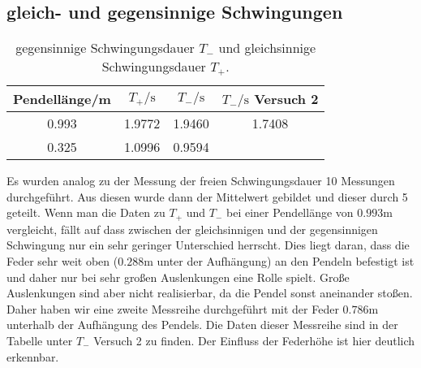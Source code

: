   \subsection{gleich- und gegensinnige Schwingungen}
    \begin{table}
      \centering
        \caption{gegensinnige Schwingungsdauer $T_{-}$ und gleichsinnige Schwingungsdauer $T_{+}$.}
        \label{tab:aufgabe23}
        \begin{tabular}{S S S S}
          \toprule
          {Pendellänge/m} & {$T_{+}/\si{\second}$} & {$T_{-}/\si{\second}$} & {$T_{-}/\si{\second}$ Versuch 2}\\
                     & 1.9772    & 1.9460   & 1.7408 \\
          0.325           & 1.0996   & 0.9594    &         \\
          \bottomrule
        \end{tabular}
    \end{table}
    Es wurden analog zu der Messung der freien Schwingungsdauer 10 Messungen durchgeführt. Aus diesen wurde dann der Mittelwert
    gebildet und dieser durch 5 geteilt. Wenn man die Daten zu $T_{+}$ und $T_{-}$ bei einer Pendellänge von $0.993$m vergleicht,
    fällt auf dass zwischen der gleichsinnigen und der gegensinnigen Schwingung nur ein sehr geringer Unterschied herrscht. Dies
    liegt daran, dass die Feder sehr weit oben ($0.288$m unter der Aufhängung) an den Pendeln befestigt ist und daher nur bei
    sehr großen Auslenkungen eine Rolle spielt. Große Auslenkungen sind aber nicht realisierbar, da die Pendel sonst aneinander
    stoßen. Daher haben wir eine zweite Messreihe durchgeführt mit der Feder $0.786$m unterhalb der Aufhängung des Pendels. Die
    Daten dieser Messreihe sind in der Tabelle unter $T_{-}$ Versuch 2 zu finden. Der Einfluss der Federhöhe ist hier deutlich
    erkennbar.
